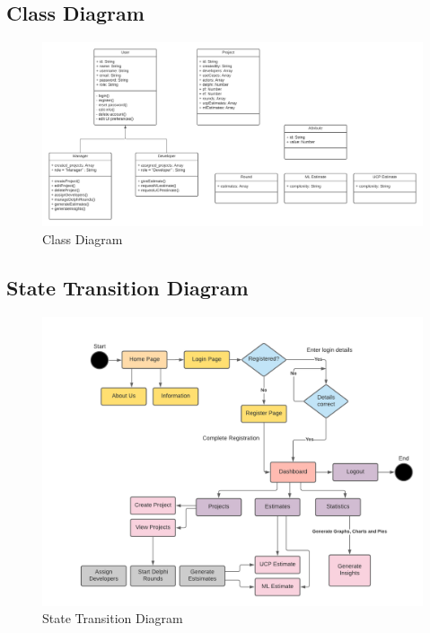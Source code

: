 




\subsection{Class Diagram}
\begin{figure}[H]
    \centering
    \includegraphics[scale=0.5]{./diagrams/class-diagram.png}
    \caption{Class Diagram}
    \label{fig:class-diag}
\end{figure}









\subsection{State Transition Diagram}
\begin{figure}[H]
    \centering
    \includegraphics[scale=0.7]{./diagrams/state-transition.png}
    \caption{State Transition Diagram}
    \label{fig:state-transition}
\end{figure}


